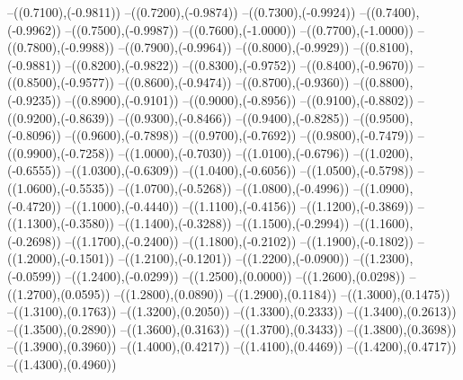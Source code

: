 {	--({\sx*(0.7100)},{\sy*(-0.9811)})
	--({\sx*(0.7200)},{\sy*(-0.9874)})
	--({\sx*(0.7300)},{\sy*(-0.9924)})
	--({\sx*(0.7400)},{\sy*(-0.9962)})
	--({\sx*(0.7500)},{\sy*(-0.9987)})
	--({\sx*(0.7600)},{\sy*(-1.0000)})
	--({\sx*(0.7700)},{\sy*(-1.0000)})
	--({\sx*(0.7800)},{\sy*(-0.9988)})
	--({\sx*(0.7900)},{\sy*(-0.9964)})
	--({\sx*(0.8000)},{\sy*(-0.9929)})
	--({\sx*(0.8100)},{\sy*(-0.9881)})
	--({\sx*(0.8200)},{\sy*(-0.9822)})
	--({\sx*(0.8300)},{\sy*(-0.9752)})
	--({\sx*(0.8400)},{\sy*(-0.9670)})
	--({\sx*(0.8500)},{\sy*(-0.9577)})
	--({\sx*(0.8600)},{\sy*(-0.9474)})
	--({\sx*(0.8700)},{\sy*(-0.9360)})
	--({\sx*(0.8800)},{\sy*(-0.9235)})
	--({\sx*(0.8900)},{\sy*(-0.9101)})
	--({\sx*(0.9000)},{\sy*(-0.8956)})
	--({\sx*(0.9100)},{\sy*(-0.8802)})
	--({\sx*(0.9200)},{\sy*(-0.8639)})
	--({\sx*(0.9300)},{\sy*(-0.8466)})
	--({\sx*(0.9400)},{\sy*(-0.8285)})
	--({\sx*(0.9500)},{\sy*(-0.8096)})
	--({\sx*(0.9600)},{\sy*(-0.7898)})
	--({\sx*(0.9700)},{\sy*(-0.7692)})
	--({\sx*(0.9800)},{\sy*(-0.7479)})
	--({\sx*(0.9900)},{\sy*(-0.7258)})
	--({\sx*(1.0000)},{\sy*(-0.7030)})
	--({\sx*(1.0100)},{\sy*(-0.6796)})
	--({\sx*(1.0200)},{\sy*(-0.6555)})
	--({\sx*(1.0300)},{\sy*(-0.6309)})
	--({\sx*(1.0400)},{\sy*(-0.6056)})
	--({\sx*(1.0500)},{\sy*(-0.5798)})
	--({\sx*(1.0600)},{\sy*(-0.5535)})
	--({\sx*(1.0700)},{\sy*(-0.5268)})
	--({\sx*(1.0800)},{\sy*(-0.4996)})
	--({\sx*(1.0900)},{\sy*(-0.4720)})
	--({\sx*(1.1000)},{\sy*(-0.4440)})
	--({\sx*(1.1100)},{\sy*(-0.4156)})
	--({\sx*(1.1200)},{\sy*(-0.3869)})
	--({\sx*(1.1300)},{\sy*(-0.3580)})
	--({\sx*(1.1400)},{\sy*(-0.3288)})
	--({\sx*(1.1500)},{\sy*(-0.2994)})
	--({\sx*(1.1600)},{\sy*(-0.2698)})
	--({\sx*(1.1700)},{\sy*(-0.2400)})
	--({\sx*(1.1800)},{\sy*(-0.2102)})
	--({\sx*(1.1900)},{\sy*(-0.1802)})
	--({\sx*(1.2000)},{\sy*(-0.1501)})
	--({\sx*(1.2100)},{\sy*(-0.1201)})
	--({\sx*(1.2200)},{\sy*(-0.0900)})
	--({\sx*(1.2300)},{\sy*(-0.0599)})
	--({\sx*(1.2400)},{\sy*(-0.0299)})
	--({\sx*(1.2500)},{\sy*(0.0000)})
	--({\sx*(1.2600)},{\sy*(0.0298)})
	--({\sx*(1.2700)},{\sy*(0.0595)})
	--({\sx*(1.2800)},{\sy*(0.0890)})
	--({\sx*(1.2900)},{\sy*(0.1184)})
	--({\sx*(1.3000)},{\sy*(0.1475)})
	--({\sx*(1.3100)},{\sy*(0.1763)})
	--({\sx*(1.3200)},{\sy*(0.2050)})
	--({\sx*(1.3300)},{\sy*(0.2333)})
	--({\sx*(1.3400)},{\sy*(0.2613)})
	--({\sx*(1.3500)},{\sy*(0.2890)})
	--({\sx*(1.3600)},{\sy*(0.3163)})
	--({\sx*(1.3700)},{\sy*(0.3433)})
	--({\sx*(1.3800)},{\sy*(0.3698)})
	--({\sx*(1.3900)},{\sy*(0.3960)})
	--({\sx*(1.4000)},{\sy*(0.4217)})
	--({\sx*(1.4100)},{\sy*(0.4469)})
	--({\sx*(1.4200)},{\sy*(0.4717)})
	--({\sx*(1.4300)},{\sy*(0.4960)})
}
